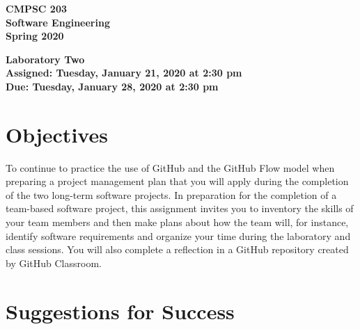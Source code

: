 \documentclass[11pt]{article}
\newcommand{\assignmentduedate}{January 28}
\newcommand{\assignmentassignedate}{January 21}
\newcommand{\assignmentnumber}{Two}
\newcommand{\labyear}{2020}
\newcommand{\labdueday}{Tuesday}
\newcommand{\labassignday}{Tuesday}
\newcommand{\labtime}{2:30 pm}
\newcommand{\assigneddate}{Assigned: \labassignday, \assignmentassignedate, \labyear{} at \labtime{}}
\newcommand{\duedate}{Due: \labdueday, \assignmentduedate, \labyear{} at \labtime{}}
\newcommand{\labtitle}[1]
{
  \begin{center}
    \begin{center}
      \bf
      CMPSC 203\\Software Engineering\\
      Spring 2020\\
      \medskip
    \end{center}
    \bf
    #1
  \end{center}
}
\begin{document}
\thispagestyle{empty}

\labtitle{Laboratory \assignmentnumber{} \\ \assigneddate{} \\ \duedate{}}

\section*{Objectives}

To continue to practice the use of GitHub and the GitHub Flow model when
preparing a project management plan that you will apply during the completion of
the two long-term software projects.
%
In preparation for the completion of a team-based software project, this
assignment invites you to inventory the skills of your team members and then
make plans about how the team will, for instance, identify software requirements
and organize your time during the laboratory and class sessions.
%
You will also complete a reflection in a GitHub repository created by GitHub
Classroom.

\section*{Suggestions for Success}
\end{document}
